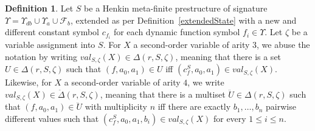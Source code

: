 \documentclass[preprint,11pt]{elsarticle}
\theoremstyle{definition}
\newtheorem{definition}{Definition}[section]
\theoremstyle{remark}
\begin{document}
\begin{definition}
Let $S$ be a Henkin meta-finite prestructure of signature $\Upsilon=\Upsilon_{db}\cup\Upsilon_a\cup\mathcal{F}_b$, extended as per Definition~\ref{extendedState} with a new and different constant symbol $c_{f_i}$ for each dynamic function symbol $f_i \in \Upsilon$. Let $\zeta$ be a variable assignment into $S$. For $X$ a second-order variable of arity $3$, we abuse the notation by writing $val_{S,\zeta}(X) \in \Delta(r,S,\zeta)$, meaning that there is a set $U \in \Delta(r,S,\zeta)$ such that $(f, a_0, a_1) \in U$ iff $(c_f^S, a_0, a_1) \in val_{S,\zeta}(X)$. Likewise, for $X$ a second-order variable of arity $4$, we write $val_{S,\zeta}(X) \in \ddot{\Delta}(r,S,\zeta)$, meaning that there is a multiset $\ddot{U} \in \Delta(r,S,\zeta)$ such that $(f, a_0, a_1) \in \ddot{U}$ with multiplicity $n$ iff there are exactly $b_1, \ldots, b_n$ pairwise different values such that $(c_f^S, a_0, a_1, b_i) \in val_{S,\zeta}(X)$ for every $1 \leq i \leq n$.


\end{definition}
\end{document}
